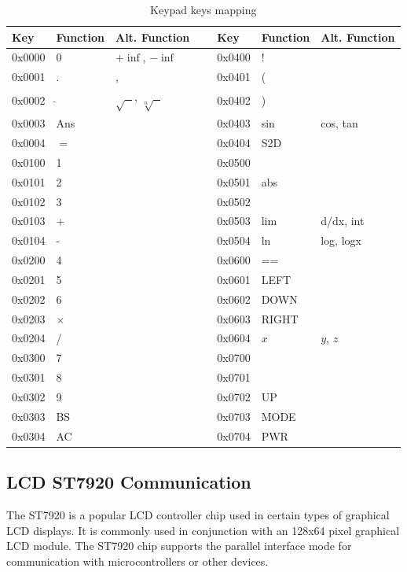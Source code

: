 \documentclass[a4paper, twoside]{report}
\begin{document}
\newpage
\begin{table}[H]
    \centering
    \begin{tabular}{|l|l|l|l|l|l|l|}
    \hline
        \textbf{Key} & \textbf{Function} & \textbf{Alt. Function} & \textbf{} & \textbf{Key} & \textbf{Function} & \textbf{Alt. Function} \\ \hline
        0x0000 & 0 & $+\inf$, $-\inf$ & ~ & 0x0400 & ! & ~ \\ \hline
        0x0001 & . & , & ~ & 0x0401 & ( & ~ \\ \hline
        0x0002 & $\hat{}$ & $\sqrt{\text{ }}$, $\sqrt[n]{\text{ }}$ & ~ & 0x0402 & ) & ~ \\ \hline
        0x0003 & Ans & ~ & ~ & 0x0403 & sin & cos, tan \\ \hline
        0x0004 & $=$ & ~ & ~ & 0x0404 & S2D & ~ \\ \hline\hline
        0x0100 & 1 & ~ & ~ & 0x0500 & ~ & ~ \\ \hline
        0x0101 & 2 & ~ & ~ & 0x0501 & abs & ~ \\ \hline
        0x0102 & 3 & ~ & ~ & 0x0502 & ~ & ~ \\ \hline
        0x0103 & + & ~ & ~ & 0x0503 & lim & d/dx, int \\ \hline
        0x0104 & - & ~ & ~ & 0x0504 & ln & log, logx \\ \hline\hline
        0x0200 & 4 & ~ & ~ & 0x0600 & == & ~ \\ \hline
        0x0201 & 5 & ~ & ~ & 0x0601 & LEFT & ~ \\ \hline
        0x0202 & 6 & ~ & ~ & 0x0602 & DOWN & ~ \\ \hline
        0x0203 & $\times$ & ~ & ~ & 0x0603 & RIGHT & ~ \\ \hline
        0x0204 & / & ~ & ~ & 0x0604 & $x$ & $y$, $z$ \\ \hline\hline
        0x0300 & 7 & ~ & ~ & 0x0700 & ~ & ~ \\ \hline
        0x0301 & 8 & ~ & ~ & 0x0701 & ~ & ~ \\ \hline
        0x0302 & 9 & ~ & ~ & 0x0702 & UP & ~ \\ \hline
        0x0303 & BS & ~ & ~ & 0x0703 & MODE & ~ \\ \hline
        0x0304 & AC & ~ & ~ & 0x0704 & PWR & ~ \\ \hline
    \end{tabular}
    \caption{Keypad keys mapping}
\end{table}

\subsection{LCD ST7920 Communication}
The ST7920 is a popular LCD controller chip used in certain types of graphical LCD displays. It is commonly used in conjunction with an 128x64 pixel graphical LCD module. The ST7920 chip supports the parallel interface mode for communication with microcontrollers or other devices.
\end{document}
